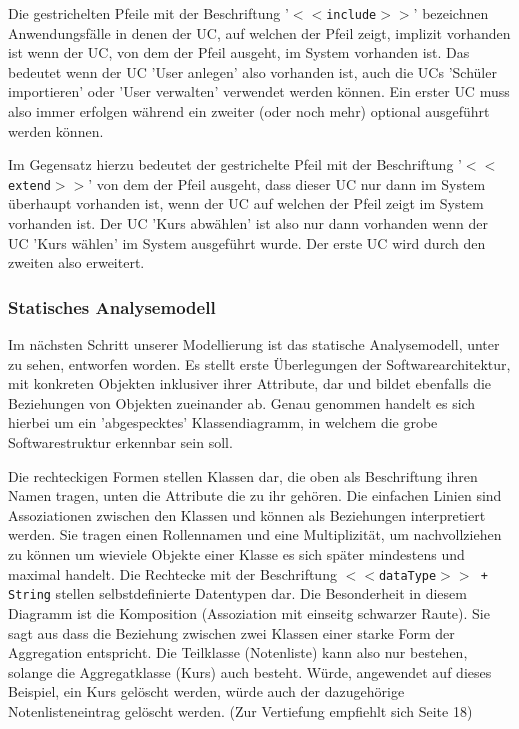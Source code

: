 \documentclass[12pt, twoside, a4paper, ngerman]{article}
\begin{document}
Die gestrichelten Pfeile mit der Beschriftung '\texttt{$<<$include$>>$}' bezeichnen Anwendungsfälle in denen der \ac{UC}, auf welchen der Pfeil zeigt, implizit vorhanden ist wenn der \ac{UC}, von dem der Pfeil ausgeht, im System vorhanden ist. Das bedeutet wenn der \ac{UC} 'User anlegen' also vorhanden ist, auch die \ac{UC}s 'Schüler importieren' oder 'User verwalten' verwendet werden können. Ein erster \ac{UC} muss also immer erfolgen während ein zweiter (oder noch mehr) optional ausgeführt werden können.

Im Gegensatz hierzu bedeutet der gestrichelte Pfeil mit der Beschriftung '\texttt{$<<$extend$>>$}' von dem der Pfeil ausgeht, dass dieser \ac{UC} nur dann im System überhaupt vorhanden ist, wenn der \ac{UC} auf welchen der Pfeil zeigt im System vorhanden ist. Der \ac{UC} 'Kurs abwählen' ist also nur dann vorhanden wenn der \ac{UC} 'Kurs wählen' im System ausgeführt wurde. Der erste \ac{UC} wird durch den zweiten also erweitert.

\subsubsection{Statisches Analysemodell}

Im nächsten Schritt unserer Modellierung ist das statische Analysemodell, unter  zu sehen, entworfen worden. Es stellt erste Überlegungen der Softwarearchitektur, mit konkreten Objekten inklusiver ihrer Attribute, dar und bildet ebenfalls die Beziehungen von Objekten zueinander ab. Genau genommen handelt es sich hierbei um ein 'abgespecktes' Klassendiagramm, in welchem die grobe Softwarestruktur erkennbar sein soll.

Die rechteckigen Formen stellen Klassen dar, die oben als Beschriftung ihren Namen tragen, unten die Attribute die zu ihr gehören. Die einfachen Linien sind Assoziationen zwischen den Klassen und können als Beziehungen interpretiert werden. Sie tragen einen Rollennamen und eine Multiplizität, um nachvollziehen zu können um wieviele Objekte einer Klasse es sich später mindestens und maximal handelt.
Die Rechtecke mit der Beschriftung \texttt{$<<$dataType$>>$ + String} stellen selbstdefinierte Datentypen dar.
Die Besonderheit in diesem Diagramm ist die Komposition (Assoziation mit einseitg schwarzer Raute). Sie sagt aus dass die Beziehung zwischen zwei Klassen einer starke Form der Aggregation entspricht. Die Teilklasse (Notenliste) kann also nur bestehen, solange die Aggregatklasse (Kurs) auch besteht. Würde, angewendet auf dieses Beispiel, ein Kurs gelöscht werden, würde auch der dazugehörige Notenlisteneintrag gelöscht werden. (Zur Vertiefung empfiehlt sich \cite{BalzertH_UML2} Seite 18)
\end{document}
